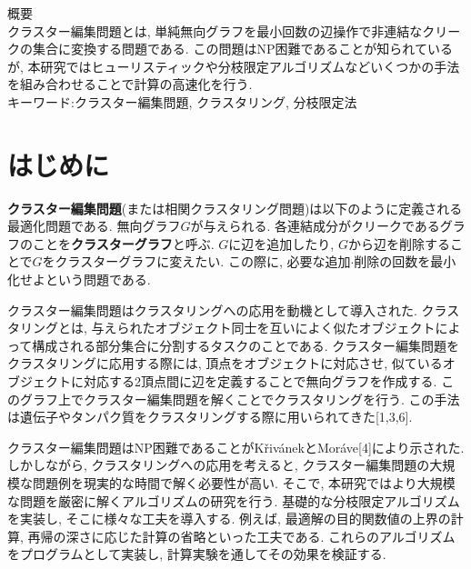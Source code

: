 \documentclass[10pt,a4j,twocolumn, dvipdfmx]{bxjsarticle}
\begin{document}
\pagestyle{empty}
\noindent
{\large 概要}\\
クラスター編集問題とは, 単純無向グラフを最小回数の辺操作で非連結なクリークの集合に変換する問題である.
この問題はNP困難であることが知られているが, 本研究ではヒューリスティックや分枝限定アルゴリズムなどいくつかの手法を組み合わせることで計算の高速化を行う.\\
\noindent
キーワード:クラスター編集問題, クラスタリング, 分枝限定法
\section{はじめに}
\textbf{クラスター編集問題}(または相関クラスタリング問題)は以下のように定義される最適化問題である.
無向グラフ$G$が与えられる.
各連結成分がクリークであるグラフのことを\textbf{クラスターグラフ}と呼ぶ.
$G$に辺を追加したり, $G$から辺を削除することで$G$をクラスターグラフに変えたい.
この際に, 必要な追加$\cdot$削除の回数を最小化せよという問題である.\par
クラスター編集問題はクラスタリングへの応用を動機として導入された.
クラスタリングとは, 与えられたオブジェクト同士を互いによく似たオブジェクトによって構成される部分集合に分割するタスクのことである.
クラスター編集問題をクラスタリングに応用する際には, 頂点をオブジェクトに対応させ, 似ているオブジェクトに対応する2頂点間に辺を定義することで無向グラフを作成する.
このグラフ上でクラスター編集問題を解くことでクラスタリングを行う.
この手法は遺伝子やタンパク質をクラスタリングする際に用いられてきた[1,3,6].\par
クラスター編集問題はNP困難であることがKřivánekとMoráve[4]により示された.
しかしながら, クラスタリングへの応用を考えると, クラスター編集問題の大規模な問題例を現実的な時間で解く必要性が高い.
そこで, 本研究ではより大規模な問題を厳密に解くアルゴリズムの研究を行う.
基礎的な分枝限定アルゴリズムを実装し, そこに様々な工夫を導入する.
例えば, 最適解の目的関数値の上界の計算, 再帰の深さに応じた計算の省略といった工夫である.
これらのアルゴリズムをプログラムとして実装し, 計算実験を通してその効果を検証する.\par
\end{document}
